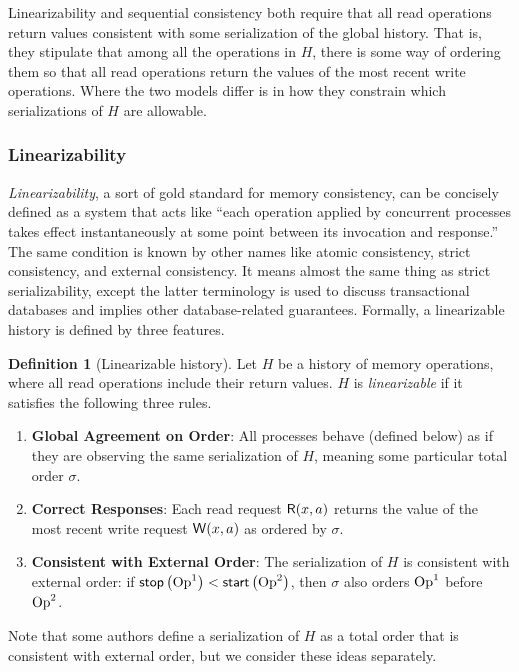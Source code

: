 \documentclass[]             %
{NASA}                       %
\theoremstyle{definition}
\newtheorem{definition}[theorem]{Definition}
\providecommand{\tightlist}{%
  \setlength{\itemsep}{0pt}\setlength{\parskip}{0pt}}
\begin{document}
Linearizability and sequential consistency both require that all read
operations return values consistent with some serialization of the
global history. That is, they stipulate that among all the operations
in $H$, there is some way of ordering them so that all read operations
return the values of the most recent write operations. Where the two
models differ is in how they constrain which serializations of $H$ are
allowable.

\subsubsection{Linearizability}
\label{sssec:linearizability}

\emph{Linearizability}, a sort of gold standard for memory
consistency, can be concisely defined as a system that acts like
``each operation applied by concurrent processes takes effect
instantaneously at some point between its invocation and response.''
\cite{10.1145/78969.78972} The same condition is known by other names
like atomic consistency, strict consistency, and external
consistency. It means almost the same thing as strict serializability,
except the latter terminology is used to discuss transactional
databases and implies other database-related guarantees. Formally, a
linearizable history is defined by three features.
\begin{definition}[Linearizable history]
  \label{def:linearizable-history}
  Let $H$ be a history of memory operations, where all read operations
  include their return values. $H$ is \emph{linearizable} if it
  satisfies the following three rules.
\begin{enumerate}
  \tightlist
\item \textbf{Global Agreement on Order}: All processes behave
  (defined below) as if they are observing the same serialization of
  $H$, meaning some particular total order $\sigma$.
\item \textbf{Correct Responses}: Each read request
  \(\mathsf{R}\!\left(x, a\right)\) returns the value of the most recent write
  request \(\mathsf{W}\!\left(x, a\right)\) as ordered by $\sigma$.
\item \textbf{Consistent with External Order}: The serialization of
  $H$ is consistent with external order: if
  $\mathsf{stop}\left(\mathrm{Op}^1\right) < \mathsf{start}\left(\mathrm{Op}^2\right)$, then $\sigma$ also orders
  $\mathrm{Op}^1$ before $\mathrm{Op}^2$.
\end{enumerate}
\end{definition}

Note that some authors define a serialization of $H$ as a total order
that is consistent with external order, but we consider these ideas
separately.
\end{document}
